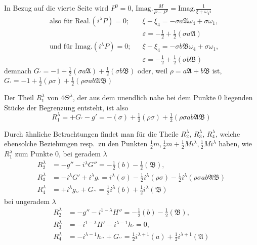 In Bezug auf die vierte Seite wird $P^0=0$, $\mathrm{Imag.}\frac M{P-P^0}=\mathrm{Imag.}\frac1{\xi+\omega_4i}$
\[
\begin{aligned}
&\text{also für }\mathrm{Real.}(i^\lambda P)=0;&&\xi-\xi_4=-\sigma a\mathfrak A\omega_4+\sigma\omega_1,\\
&&&\varepsilon=-\tfrac12+\tfrac12(\sigma a\mathfrak A)\\
&\text{und für }\mathrm{Imag.}(i^\lambda P)=0;&&\xi-\xi_4=-\sigma b\mathfrak B\omega_4+\sigma\omega_1,\\
&&&\varepsilon=-\tfrac12+\tfrac12(\sigma b\mathfrak B)
\end{aligned}
\]
demnach $G_{\prime}=-1+\tfrac12(\sigma a\mathfrak A)+\tfrac12(\sigma b\mathfrak B)$ oder, weil $\rho=a\mathfrak A+b\mathfrak B$ ist, $G_{\prime}=-1+\tfrac12(\rho\sigma)+\tfrac12(\rho\sigma ab\mathfrak A\mathfrak B)$

Der Theil $R_1^\lambda$ von $4\Theta^\lambda$, der aus dem unendlich nahe bei dem Punkte $0$ liegenden Stücke der Begrenzung entsteht, ist also
\[
R_1^\lambda=+G_{\prime}-g'=-(\sigma)+\tfrac12(\rho\sigma)+\tfrac12(\rho\sigma ab\mathfrak A\mathfrak B)
\]

Durch ähnliche Betrachtungen findet man für die Theile $R_2^\lambda$, $R_3^\lambda$, $R_4^\lambda$, welche ebensolche Beziehungen resp.\ zu den Punkten $\tfrac12m,\tfrac12m+\tfrac12Mi^\lambda,\tfrac12Mi^\lambda$ haben, wie $R_1^\lambda$ zum Punkte $0$, bei geradem $\lambda$
\[
\begin{aligned}
R_2^\lambda&=-g''-i^\lambda G''=-\tfrac12(b)-\tfrac12(\mathfrak B),\\
R_3^\lambda&=-i^\lambda G'+i^\lambda g_{\prime}=i^\lambda(\sigma)-\tfrac12i^\lambda(\rho\sigma)-\tfrac12i^\lambda(\rho\sigma ab\mathfrak A\mathfrak B)\\
R_4^\lambda&=+i^\lambda g_{\prime\prime}+G_{\prime\prime}=\tfrac12i^\lambda(b)+\tfrac12i^\lambda(\mathfrak B)
\end{aligned}
\]
bei ungeradem $\lambda$
\[
\begin{aligned}
R_2^\lambda&=-g''-i^{1-\lambda}H''=-\tfrac12(b)-\tfrac12(\mathfrak B),\\
R_3^\lambda&=-i^{1-\lambda}H'-i^{\lambda-1}h_{\prime}=0,\\
R_4^\lambda&=-i^{\lambda-1}h_{\prime\prime}+G_{\prime\prime}=\tfrac12i^{\lambda+1}(a)+\tfrac12i^{\lambda+1}(\mathfrak A)
\end{aligned}
\]

